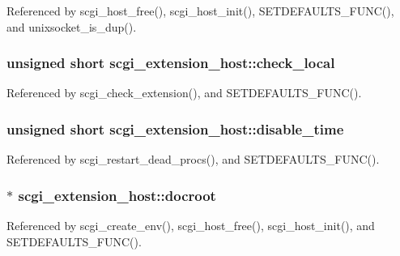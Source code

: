 Referenced by scgi\-\_\-host\-\_\-free(), scgi\-\_\-host\-\_\-init(), S\-E\-T\-D\-E\-F\-A\-U\-L\-T\-S\-\_\-\-F\-U\-N\-C(), and unixsocket\-\_\-is\-\_\-dup().

\hypertarget{structscgi__extension__host_a73c33e5ed6971d2741059c89b9e5af8c}{
\subsubsection[{check\-\_\-local}]{\setlength{\rightskip}{0pt plus 5cm}unsigned short scgi\-\_\-extension\-\_\-host\-::check\-\_\-local}}\label{structscgi__extension__host_a73c33e5ed6971d2741059c89b9e5af8c}


Referenced by scgi\-\_\-check\-\_\-extension(), and S\-E\-T\-D\-E\-F\-A\-U\-L\-T\-S\-\_\-\-F\-U\-N\-C().

\hypertarget{structscgi__extension__host_a4cd200c0ffcffef09e122e14571e0b64}{
\subsubsection[{disable\-\_\-time}]{\setlength{\rightskip}{0pt plus 5cm}unsigned short scgi\-\_\-extension\-\_\-host\-::disable\-\_\-time}}\label{structscgi__extension__host_a4cd200c0ffcffef09e122e14571e0b64}


Referenced by scgi\-\_\-restart\-\_\-dead\-\_\-procs(), and S\-E\-T\-D\-E\-F\-A\-U\-L\-T\-S\-\_\-\-F\-U\-N\-C().

\hypertarget{structscgi__extension__host_a30ebc957e3a70bcbef54fc6bf66b5105}{
\subsubsection[{docroot}]{$\ast$ scgi\-\_\-extension\-\_\-host\-::docroot}}\label{structscgi__extension__host_a30ebc957e3a70bcbef54fc6bf66b5105}


Referenced by scgi\-\_\-create\-\_\-env(), scgi\-\_\-host\-\_\-free(), scgi\-\_\-host\-\_\-init(), and S\-E\-T\-D\-E\-F\-A\-U\-L\-T\-S\-\_\-\-F\-U\-N\-C().

